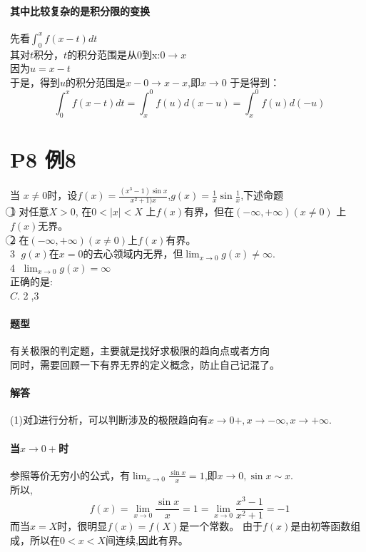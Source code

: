 \documentclass[a4paper]{ctexart}
\begin{document}
\begin{multicols}{2}
\paragraph{其中比较复杂的是积分限的变换}
先看$\int_{0}^{x}{f(x-t)dt}$\\
其对$t$积分，$t$的积分范围是从0到x:$0 \rightarrow x$\\
因为$u = x-t$\\
于是，得到$u$的积分范围是$x-0 \rightarrow x-x$,即$x \rightarrow 0$
于是得到：
$$
\int_{0}^{x}{f(x-t)dt}
=
\int_{x}^{0}{f(u)d(x-u)}
=
\int_{x}^{0}{f(u)d(-u)}
$$

\section{P8 例8}
当 $x\neq 0$时，设$f(x) = \frac{(x^3-1)\sin{x}}{x^2+1)x}$,$g(x)=\frac{1}{x}\sin{\frac{1}{x}}$,下述命题\\
\textcircled{1} 对任意$X>0$, 在$0< \left| x \right| <X$ 上$f(x)$有界，但在$(-\infty,+\infty)(x\neq 0)$ 上$f(x)$无界。\\
\textcircled{2} 在$(-\infty,+\infty)(x \neq 0)$上$f(x)$有界。\\
\textcircled{3} $g(x)$在$x=0$的去心领域内无界，但$\lim_{x\rightarrow 0}{g(x) \neq \infty}$.\\
\textcircled{4} $\lim_{x \rightarrow 0}{g(x) = \infty}$\\
正确的是:\\
$C.$ \textcircled{2},\textcircled{3}\\
\paragraph{题型}
有关极限的判定题，主要就是找好求极限的趋向点或者方向\\
同时，需要回顾一下有界无界的定义概念，防止自己记混了。
\paragraph{解答}
(1)对\textcircled{1}进行分析，可以判断涉及的极限趋向有$x\rightarrow 0+, x\rightarrow -\infty, x\rightarrow +\infty$.\\
\paragraph{当$x\rightarrow 0+$时}
参照等价无穷小的公式，有$\lim_{x\rightarrow 0}{\frac{\sin{x}}{x}=1}$,即$x\rightarrow 0, \sin{x}\sim x$.\\
所以,
$$
f(x) = \lim_{x\rightarrow 0}{\frac{\sin{x}}{x}=1}
= \lim_{x\rightarrow 0}{\frac{x^3-1}{x^2+1}} = -1
$$
而当$x=X$时，很明显$f(x)=f(X)$是一个常数。 由于$f(x)$是由初等函数组成，所以在$0<x<X$间连续,因此有界。\\

\end{multicols}
\end{document}
